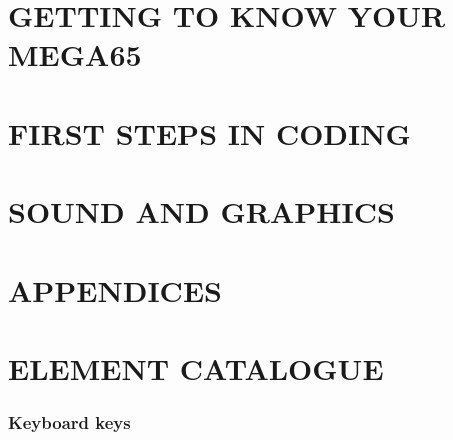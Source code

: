 \documentclass{book}
\begin{document}


\cleardoublepage
{}

\part{GETTING TO KNOW YOUR MEGA65}




\part{FIRST STEPS IN CODING}






\part{SOUND AND GRAPHICS}





\part{APPENDICES}

\begin{appendices}

  
  
  
  
  
  
  
  
  
  
  
  
  
  
  
  
\end{appendices}






\printindex

\part{ELEMENT CATALOGUE}


\section{Keyboard keys}
\end{document}
